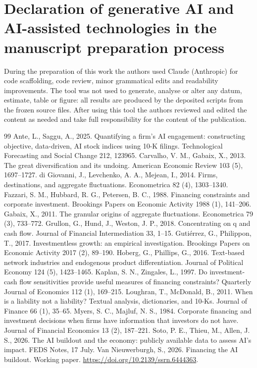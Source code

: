 \documentclass[preprint,11pt]{elsarticle}
\begin{document}
\section*{Declaration of generative AI and AI-assisted technologies in the manuscript preparation process}
During the preparation of this work the authors used Claude (Anthropic) for code scaffolding, code
review, minor grammatical edits and readability improvements. The tool was not used to generate,
analyse or alter any datum, estimate, table or figure: all results are produced by the deposited
scripts from the frozen source files. After using this tool the authors reviewed and edited the
content as needed and take full responsibility for the content of the publication.

\begin{thebibliography}{99}
 Ante, L., Saggu, A., 2025. Quantifying a firm's AI engagement: constructing objective, data-driven, AI stock indices using 10-K filings. Technological Forecasting and Social Change 212, 123965.
 Carvalho, V. M., Gabaix, X., 2013. The great diversification and its undoing. American Economic Review 103 (5), 1697--1727.
 di Giovanni, J., Levchenko, A. A., Mejean, I., 2014. Firms, destinations, and aggregate fluctuations. Econometrica 82 (4), 1303--1340.
 Fazzari, S. M., Hubbard, R. G., Petersen, B. C., 1988. Financing constraints and corporate investment. Brookings Papers on Economic Activity 1988 (1), 141--206.
 Gabaix, X., 2011. The granular origins of aggregate fluctuations. Econometrica 79 (3), 733--772.
 Grullon, G., Hund, J., Weston, J. P., 2018. Concentrating on q and cash flow. Journal of Financial Intermediation 33, 1--15.
 Guti\'errez, G., Philippon, T., 2017. Investmentless growth: an empirical investigation. Brookings Papers on Economic Activity 2017 (2), 89--190.
 Hoberg, G., Phillips, G., 2016. Text-based network industries and endogenous product differentiation. Journal of Political Economy 124 (5), 1423--1465.
 Kaplan, S. N., Zingales, L., 1997. Do investment-cash flow sensitivities provide useful measures of financing constraints? Quarterly Journal of Economics 112 (1), 169--215.
 Loughran, T., McDonald, B., 2011. When is a liability not a liability? Textual analysis, dictionaries, and 10-Ks. Journal of Finance 66 (1), 35--65.
 Myers, S. C., Majluf, N. S., 1984. Corporate financing and investment decisions when firms have information that investors do not have. Journal of Financial Economics 13 (2), 187--221.
 Soto, P. E., Thieu, M., Allen, J. S., 2026. The AI buildout and the economy: publicly available data to assess AI's impact. FEDS Notes, 17 July.
 Van Nieuwerburgh, S., 2026. Financing the AI buildout. Working paper. \url{https://doi.org/10.2139/ssrn.6444363}.
\end{thebibliography}
\end{document}
